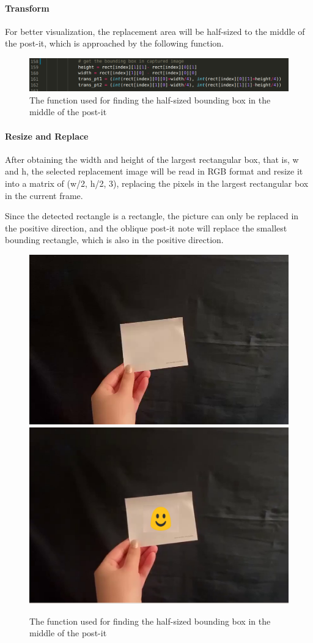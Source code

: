 \documentclass[a4paper, twoside]{report}
\begin{document}
{{\newpage
\paragraph{Transform} For better visualization, the replacement area will be half-sized to the middle of the post-it, which is approached by the following function.

\begin{figure}[h!]
\centering
\includegraphics[width=.9\textwidth]{code1.png}
\caption{The function used for finding the half-sized bounding box in the middle of the post-it}
\end{figure}

\paragraph{Resize and Replace} After obtaining the width and height of the largest rectangular box, that is, w and h, the selected replacement image will be read in RGB format and resize it into a matrix of (w/2, h/2, 3), replacing the pixels in the largest rectangular box in the current frame. \\ \par



\noindent Since the detected rectangle is a rectangle, the picture can only be replaced in the positive direction, and the oblique post-it note will replace the smallest bounding rectangle, which is also in the positive direction.\\ \par

\begin{figure}[h!]
\centering
\includegraphics[width=.45\textwidth]{video.png}
\includegraphics[width=.45\textwidth]{video1.png}
\caption{The function used for finding the half-sized bounding box in the middle of the post-it}
\end{figure}

}}
\end{document}
